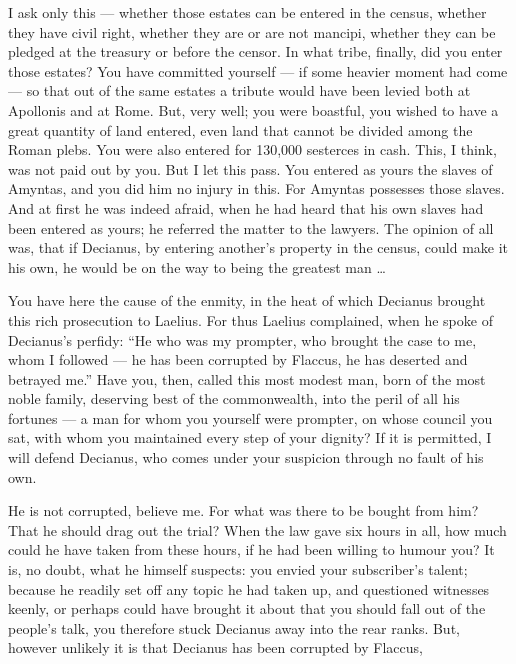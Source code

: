  I ask only this --- whether those estates can be entered in the census, whether they have civil right, whether they are or are not mancipi, whether they can be pledged at the treasury or before the censor. In what tribe, finally, did you enter those estates? You have committed yourself --- if some heavier moment had come --- so that out of the same estates a tribute would have been levied both at Apollonis and at Rome. But, very well; you were boastful, you wished to have a great quantity of land entered, even land that cannot be divided among the Roman plebs. You were also entered for 130,000 sesterces in cash. This, I think, was not paid out by you. But I let this pass. You entered as yours the slaves of Amyntas, and you did him no injury in this. For Amyntas possesses those slaves. And at first he was indeed afraid, when he had heard that his own slaves had been entered as yours; he referred the matter to the lawyers. The opinion of all was, that if Decianus, by entering another's property in the census, could make it his own, he would be on the way to being the greatest man \ldots

 You have here the cause of the enmity, in the heat of which Decianus brought this rich prosecution to Laelius. For thus Laelius complained, when he spoke of Decianus's perfidy: ``He who was my prompter, who brought the case to me, whom I followed --- he has been corrupted by Flaccus, he has deserted and betrayed me.'' Have you, then, called this most modest man, born of the most noble family, deserving best of the commonwealth, into the peril of all his fortunes --- a man for whom you yourself were prompter, on whose council you sat, with whom you maintained every step of your dignity? If it is permitted, I will defend Decianus, who comes under your suspicion through no fault of his own.

 He is not corrupted, believe me. For what was there to be bought from him? That he should drag out the trial? When the law gave six hours in all, how much could he have taken from these hours, if he had been willing to humour you? It is, no doubt, what he himself suspects: you envied your subscriber's talent; because he readily set off any topic he had taken up, and questioned witnesses keenly, or perhaps could have brought it about that you should fall out of the people's talk, you therefore stuck Decianus away into the rear ranks. But, however unlikely it is that Decianus has been corrupted by Flaccus,

